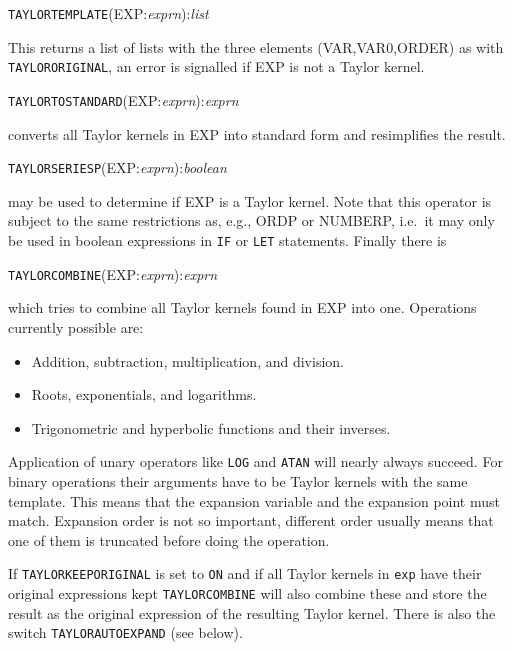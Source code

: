 \hspace*{2em} {\tt TAYLORTEMPLATE}(EXP:{\em exprn}):{\em list}

This returns a list of lists with the three elements (VAR,VAR0,ORDER)
as with \verb|TAYLORORIGINAL|,
an error is signalled if EXP is not a Taylor kernel.

\hspace*{2em} {\tt TAYLORTOSTANDARD}(EXP:{\em exprn}):{\em exprn}

converts all Taylor kernels in EXP into standard form and
 resimplifies the result.

\hspace*{2em} {\tt TAYLORSERIESP}(EXP:{\em exprn}):{\em boolean}

may be used to determine if EXP is a Taylor kernel.
 Note that this operator is subject to the same
restrictions as, e.g., ORDP or NUMBERP, i.e.\ it may only be used in
boolean expressions in \verb|IF| or \verb|LET| statements.  Finally
there is

\hspace*{2em} {\tt TAYLORCOMBINE}(EXP:{\em exprn}):{\em exprn}

which tries to combine all Taylor kernels found in EXP into one.
Operations currently possible are:
\begin{itemize}
  \item Addition, subtraction, multiplication, and division.
  \item Roots, exponentials, and logarithms.
  \item Trigonometric and hyperbolic functions and their inverses.
\end{itemize}
Application of unary operators like \verb|LOG| and \verb|ATAN| will
nearly always succeed. For binary operations their arguments have to be
Taylor kernels with the same template. This means that the expansion
variable and the expansion point must match. Expansion order is not so
important, different order usually means that one of them is truncated
before doing the operation.

 
If \verb|TAYLORKEEPORIGINAL| is set to \verb|ON| and if all Taylor
kernels in \verb|exp| have their original expressions kept
\verb|TAYLORCOMBINE| will also combine these and store the result
as the original expression of the resulting Taylor kernel.
There is also the switch \verb|TAYLORAUTOEXPAND| (see below).

